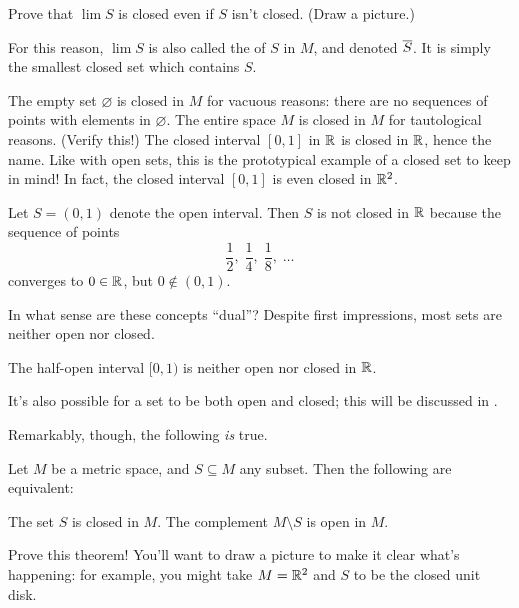 \begin{exercise}
	Prove that $\lim S$ is closed even if $S$ isn't closed. (Draw a picture.)
\end{exercise}
For this reason, $\lim S$ is also called the  of $S$ in $M$,
and denoted $\overline S$.  It is simply the smallest closed set which contains $S$.

\begin{example}
	\listhack
	\begin{enumerate}[(a)]
		\ii The empty set $\varnothing$ is closed in $M$ for vacuous reasons:
		there are no sequences of points with elements in $\varnothing$.
		\ii The entire space $M$ is closed in $M$ for tautological reasons.
		(Verify this!)
		\ii The closed interval $[0,1]$ in $\mathbb R$ is closed in $\mathbb R$, hence the name.  Like with open sets, this is the prototypical example of a closed set to keep in mind!
		\ii In fact, the closed interval $[0,1]$ is even closed in $\mathbb R^2$.
	\end{enumerate}
\end{example}
\begin{example}
	Let $S=(0,1)$ denote the open interval.
	Then $S$ is not closed in $\mathbb R$
	because the sequence of points
	\[
		\frac12, \;
		\frac14, \;
		\frac18, \;
		\dots
	\]
	converges to $0 \in \mathbb R$, but $0 \notin (0,1)$.
\end{example}

In what sense are these concepts ``dual''?
Despite first impressions, most sets are neither open nor closed.
\begin{example}
	The half-open interval $[0,1)$ is neither open nor closed in $\mathbb R$.
\end{example}
\begin{remark}
	It's also possible for a set to be both open and closed;
	this will be discussed in .
\end{remark}

Remarkably, though, the following \emph{is} true.
\begin{theorem}
	Let $M$ be a metric space, and $S \subseteq M$ any subset.
	Then the following are equivalent:
	\begin{itemize}
		\ii The set $S$ is closed in $M$.
		\ii The complement $M \setminus S$ is open in $M$.
	\end{itemize}
\end{theorem}
\begin{exercise}
	Prove this theorem!
	You'll want to draw a picture to make it clear what's happening: for example,
	you might take $M = \mathbb R^2$ and $S$ to be the closed unit disk.
\end{exercise}

